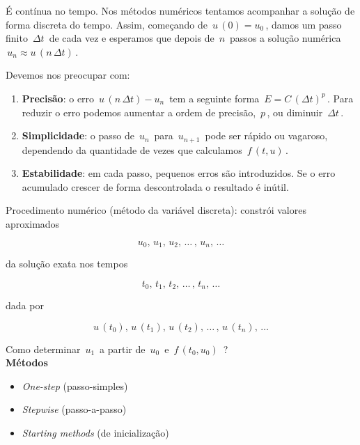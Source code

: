 É contínua no tempo. Nos métodos numéricos tentamos acompanhar a solução de forma discreta do tempo. Assim, começando de $ \, u \, (0) = u_0 \, $, damos um passo finito $ \, \Delta t \, $ de cada vez e esperamos que depois de $ \, n \, $ passos a solução numérica $ \, u_n \approx u \, (n \, \Delta t) \, $.

Devemos nos preocupar com:

\begin{enumerate}

\item \textbf{Precisão}: o erro $ \, u \, (n \, \Delta t) - u_n \, $ tem a seguinte forma $ \, E = C \, (\Delta t)^p \, $. Para reduzir o erro podemos aumentar a ordem de precisão, $ \, p \, $, ou diminuir $ \, \Delta t \, $.

\item \textbf{Simplicidade}: o passo de $ \, u_n \, $ para $ \, u_{n+1} \, $ pode ser rápido ou vagaroso, dependendo da quantidade de vezes que calculamos $ \, f \, (t, u) \, $.

\item \textbf{Estabilidade}: em cada passo, pequenos erros são introduzidos. Se o erro acumulado crescer de forma descontrolada o resultado é inútil.

\end{enumerate}

Procedimento numérico (método da variável discreta): constrói valores aproximados

\[
 u_0, \, u_1, \, u_2, \, \ldots \, , \, u_n, \, \ldots
\]

da solução exata nos tempos

\[
 t_0, \, t_1, \, t_2, \, \ldots \, , \, t_n, \, \ldots
\]

dada por

\[
 u \, (t_0), \, u \, (t_1), \, u \, (t_2), \, \ldots \, , \, u \, (t_n), \, \ldots
\]

Como determinar $ \, u_1 \, $ a partir de $ \, u_0 \, $ e $ \, f \, (t_0, u_0) \, $ ?\\

\textbf{Métodos}

\begin{itemize}

\item \textit{One-step} (passo-simples)

\item \textit{Stepwise} (passo-a-passo)

\item \textit{Starting methods} (de inicialização)

\end{itemize}

